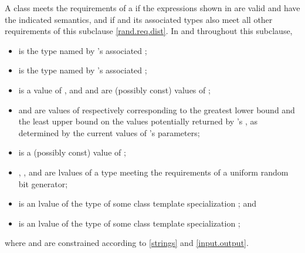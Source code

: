 \pnum
A class 
meets the requirements
of a 
if the expressions shown
in 
are valid and have the indicated semantics,
and if  and its associated types
also meet all other requirements
of this subclause \ref{rand.req.dist}.
In  and throughout this subclause,
\begin{itemize}
  \item
     is the type named by
    's associated ;
  \item
     is the type named by
    's associated ;
  \item
     is a
    value of ,
    and
     and  are (possibly const) values of ;
  \item
     and 
    are values of 
    respectively corresponding to
    the greatest lower bound and the least upper bound
    on the values potentially returned by 's ,
    as determined by the current values of 's parameters;
  \item
     is a (possibly const) value of ;
  \item
    , , and  are lvalues of a type
    meeting the requirements
    of a uniform random bit generator;
  \item
     is an lvalue of the type of some class template specialization
     ;
  and
  \item
     is an lvalue of the type of some class template specialization
     ;
\end{itemize}
where  and  are constrained
according to \ref{strings} and \ref{input.output}.

